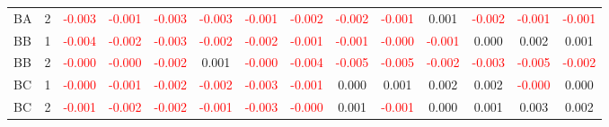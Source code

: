 \begin{table}[!htb]
{\begin{tabular}{llcccccccccccc}
BA & 2 & \textcolor{red}{-0.003} & \textcolor{red}{-0.001} & \textcolor{red}{-0.003} & \textcolor{red}{-0.003} & \textcolor{red}{-0.001} & \textcolor{red}{-0.002} & \textcolor{red}{-0.002} & \textcolor{red}{-0.001} & 0.001 & \textcolor{red}{-0.002} & \textcolor{red}{-0.001} & \textcolor{red}{-0.001}\\
BB & 1 & \textcolor{red}{-0.004} & \textcolor{red}{-0.002} & \textcolor{red}{-0.003} & \textcolor{red}{-0.002} & \textcolor{red}{-0.002} & \textcolor{red}{-0.001} & \textcolor{red}{-0.001} & \textcolor{red}{-0.000} & \textcolor{red}{-0.001} & 0.000 & 0.002 & 0.001\\
BB & 2 & \textcolor{red}{-0.000} & \textcolor{red}{-0.000} & \textcolor{red}{-0.002} & 0.001 & \textcolor{red}{-0.000} & \textcolor{red}{-0.004} & \textcolor{red}{-0.005} & \textcolor{red}{-0.005} & \textcolor{red}{-0.002} & \textcolor{red}{-0.003} & \textcolor{red}{-0.005} & \textcolor{red}{-0.002}\\
BC & 1 & \textcolor{red}{-0.000} & \textcolor{red}{-0.001} & \textcolor{red}{-0.002} & \textcolor{red}{-0.002} & \textcolor{red}{-0.003} & \textcolor{red}{-0.001} & 0.000 & 0.001 & 0.002 & 0.002 & \textcolor{red}{-0.000} & 0.000\\
BC & 2 & \textcolor{red}{-0.001} & \textcolor{red}{-0.002} & \textcolor{red}{-0.002} & \textcolor{red}{-0.001} & \textcolor{red}{-0.003} & \textcolor{red}{-0.000} & 0.001 & \textcolor{red}{-0.001} & 0.000 & 0.001 & 0.003 & 0.002\\
\hline
    \end{tabular}%
    }
\end{table}

